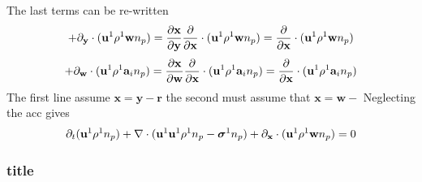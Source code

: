 \documentclass[11pt]{My_preprint}
\begin{document}
The last terms can be re-written 
\begin{equation*}
    +{\partial_\textbf{y}}\cdot (\textbf{u}^1 \rho^1  \textbf{w}n_p)
    = 
    \frac{\partial \textbf{x}}{\partial \textbf{y}}
    \frac{\partial }{\partial \textbf{x}}
    \cdot (\textbf{u}^1 \rho^1  \textbf{w}n_p)
    = 
    \frac{\partial }{\partial \textbf{x}}
    \cdot (\textbf{u}^1 \rho^1  \textbf{w}n_p)
\end{equation*}
\begin{equation*}
    +{\partial_\textbf{w}}\cdot (\textbf{u}^1 \rho^1  \textbf{a}_i n_p)
    = 
    \frac{\partial \textbf{x}}{\partial \textbf{w}}
    \frac{\partial }{\partial \textbf{x}}
    \cdot (\textbf{u}^1 \rho^1  \textbf{a}_i n_p)
    = 
    \frac{\partial }{\partial \textbf{x}}
    \cdot (\textbf{u}^1 \rho^1  \textbf{a}_i n_p)
\end{equation*}
The first line assume $\textbf{x} = \textbf{y}- \textbf{r}$ the second must assume that $\textbf{x} = \textbf{w}-$
Neglecting the acc gives 
\begin{align*}
    \partial_t (\textbf{u}^1 \rho^1n_p) + \mathbf{\nabla}\cdot(\textbf{u}^1 \textbf{u}^1 \rho^1 n_p - \bm\sigma^1n_p) 
    +{\partial_\textbf{x}}\cdot (\textbf{u}^1 \rho^1  \textbf{w}n_p)
    = 0 \\
\end{align*}
\subsubsection*{title}
\end{document}
